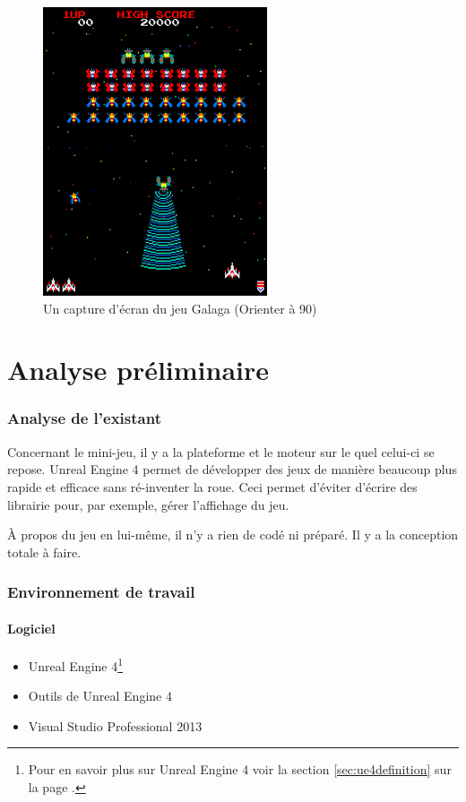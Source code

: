 \documentclass[11pt, a4paper, oneside]{article}
\begin{document}
\begin{figure}[h]
	\begin{center}
	\includegraphics[scale=0.8, angle=90]{Galaga}
	\caption{Un capture d'écran du jeu Galaga (Orienter à 90\degre)}
	\end{center}
\end{figure}

\newpage
\part{Analyse préliminaire}
\section{Analyse de l'existant}
Concernant le mini-jeu, il y a la plateforme et le moteur sur le quel celui-ci se repose. Unreal Engine 4 permet de développer des jeux de manière beaucoup plus rapide et efficace sans ré-inventer la roue. Ceci permet d'éviter d'écrire des librairie pour, par exemple, gérer l'affichage du jeu.

À propos du jeu en lui-même, il n'y a rien de codé ni préparé. Il y a la conception totale à faire.
\section{Environnement de travail}
\subsection{Logiciel}
\begin{itemize}
\item Unreal Engine 4\footnote{Pour en savoir plus sur Unreal Engine 4 voir la section \ref{sec:ue4definition} sur la page \pageref{sec:ue4definition}.}
\item Outils de Unreal Engine 4
\item Visual Studio Professional 2013\\
\end{itemize}
\end{document}
